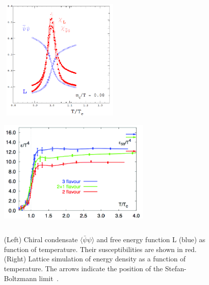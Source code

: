 \begin{figure}[!t]
\includegraphics[width=6cm,height=6cm]{FigCap1/Lattice1.png} 
\includegraphics[width=7.5cm,height=5.8cm]{FigCap1/Lattice2.png}
 \caption{(Left) Chiral condensate $\langle \bar{\psi}\psi\rangle$ and free energy function L (blue) as function of temperature. Their susceptibilities are shown in red. (Right) Lattice simulation of energy density as a function of temperature. The arrows indicate the position of the Stefan-Boltzmann limit~\cite{Karsch:2001vs}.}
\label{fig:Lattice}
\end{figure}

